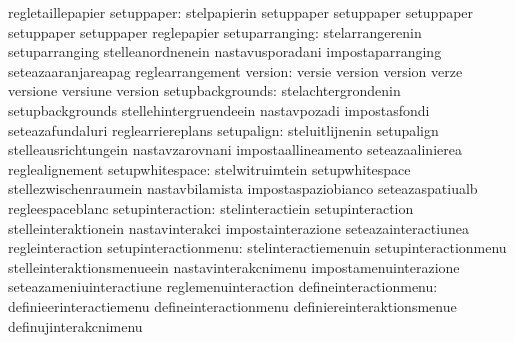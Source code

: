                                   regletaillepapier
                      setuppaper: stelpapierin                     setuppaper
                                  setuppaper                       setuppaper
                                  setuppaper                       setuppaper
                                  reglepapier
                  setuparranging: stelarrangerenin                 setuparranging
                                  stelleanordnenein                nastavusporadani
                                  impostaparranging                seteazaaranjareapag
                                  reglearrangement
                         version: versie                           version
                                  version                          verze
                                  versione                         versiune
                                  version
                setupbackgrounds: stelachtergrondenin              setupbackgrounds
                                  stellehintergruendeein           nastavpozadi
                                  impostasfondi                    seteazafundaluri
                                  reglearriereplans
                      setupalign: steluitlijnenin                  setupalign
                                  stelleausrichtungein             nastavzarovnani
                                  impostaallineamento              seteazaalinierea
                                  reglealignement
                 setupwhitespace: stelwitruimtein                  setupwhitespace
                                  stellezwischenraumein            nastavbilamista
                                  impostaspaziobianco              seteazaspatiualb
                                  regleespaceblanc
                setupinteraction: stelinteractiein                 setupinteraction
                                  stelleinteraktionein             nastavinterakci
                                  impostainterazione               seteazainteractiunea
                                  regleinteraction
            setupinteractionmenu: stelinteractiemenuin             setupinteractionmenu
                                  stelleinteraktionsmenueein       nastavinterakcnimenu
                                  impostamenuinterazione           seteazameniuinteractiune
                                  reglemenuinteraction
           defineinteractionmenu: definieerinteractiemenu          defineinteractionmenu
                                  definiereinteraktionsmenue       definujinterakcnimenu

